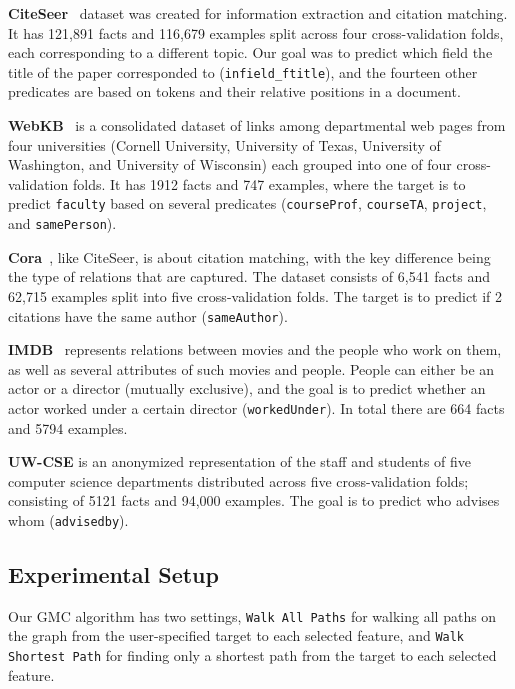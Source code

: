 \documentclass[sigconf]{acmart}
\begin{document}
\noindent \textbf{CiteSeer}~\cite{poon07} dataset was created for information extraction and citation matching. It has 121,891 facts and 116,679 examples split across four cross-validation folds, each corresponding to a different topic. Our goal was to predict which field the title of the paper corresponded to (\texttt{infield\_ftitle}), and the fourteen other predicates are based on tokens and their relative positions in a document.

\noindent \textbf{WebKB}~\cite{bottomupmln07} is a consolidated dataset of links among departmental web pages from four universities (Cornell University, University of Texas, University of Washington, and University of Wisconsin) each grouped into one of four cross-validation folds. It has 1912 facts and 747 examples, where the target is to predict \texttt{faculty} based on several predicates (\texttt{courseProf}, \texttt{courseTA}, \texttt{project}, and \texttt{samePerson}).

\noindent \textbf{Cora}~\cite{poon07}, like CiteSeer, is about citation matching, with the key difference being the type of relations that are captured. The dataset consists of 6,541 facts and 62,715 examples split into five cross-validation folds. The target is to predict if 2 citations have the same author (\texttt{sameAuthor}).

\noindent \textbf{IMDB}~\cite{bottomupmln07} represents relations between movies and the people who work on them, as well as several attributes of such movies and people. People can either be an actor or a director (mutually exclusive), and the goal is to predict whether an actor worked under a certain director (\texttt{workedUnder}). In total there are 664 facts and 5794 examples.

\noindent \textbf{UW-CSE} is an anonymized representation of the staff and students of five computer science departments distributed across five cross-validation folds; consisting of 5121 facts and 94,000 examples. The goal is to predict who advises whom (\texttt{advisedby}).

\subsection{Experimental Setup}

Our \textsc{GMC} algorithm has two settings, \texttt{Walk All Paths} for walking all paths on the graph from the user-specified target to each selected feature, and \texttt{Walk Shortest Path} for finding only a shortest path from the target to each selected feature.
\end{document}
